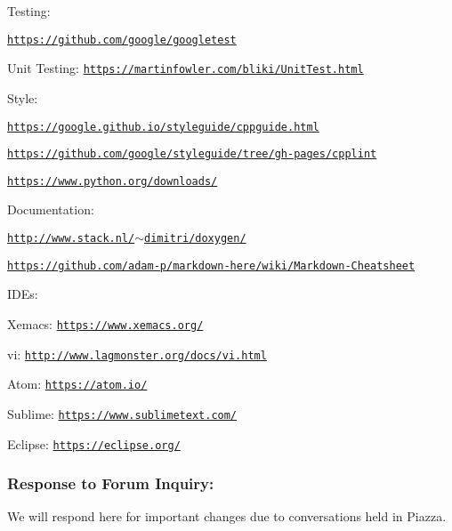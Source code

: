 Testing\+:
\begin{DoxyItemize}
\item \href{https://github.com/google/googletest}{\tt https\+://github.\+com/google/googletest}
\item Unit Testing\+: \href{https://martinfowler.com/bliki/UnitTest.html}{\tt https\+://martinfowler.\+com/bliki/\+Unit\+Test.\+html}
\end{DoxyItemize}

Style\+:
\begin{DoxyItemize}
\item \href{https://google.github.io/styleguide/cppguide.html}{\tt https\+://google.\+github.\+io/styleguide/cppguide.\+html}
\item \href{https://github.com/google/styleguide/tree/gh-pages/cpplint}{\tt https\+://github.\+com/google/styleguide/tree/gh-\/pages/cpplint}
\item \href{https://www.python.org/downloads/}{\tt https\+://www.\+python.\+org/downloads/}
\end{DoxyItemize}

Documentation\+:
\begin{DoxyItemize}
\item \href{http://www.stack.nl/~dimitri/doxygen/}{\tt http\+://www.\+stack.\+nl/$\sim$dimitri/doxygen/}
\item \href{https://github.com/adam-p/markdown-here/wiki/Markdown-Cheatsheet}{\tt https\+://github.\+com/adam-\/p/markdown-\/here/wiki/\+Markdown-\/\+Cheatsheet}
\end{DoxyItemize}

I\+D\+Es\+:
\begin{DoxyItemize}
\item Xemacs\+: \href{https://www.xemacs.org/}{\tt https\+://www.\+xemacs.\+org/}
\item vi\+: \href{http://www.lagmonster.org/docs/vi.html}{\tt http\+://www.\+lagmonster.\+org/docs/vi.\+html}
\item Atom\+: \href{https://atom.io/}{\tt https\+://atom.\+io/}
\item Sublime\+: \href{https://www.sublimetext.com/}{\tt https\+://www.\+sublimetext.\+com/}
\item Eclipse\+: \href{https://eclipse.org/}{\tt https\+://eclipse.\+org/}
\end{DoxyItemize}





\subsubsection*{Response to Forum Inquiry\+:}

We will respond here for important changes due to conversations held in Piazza. 